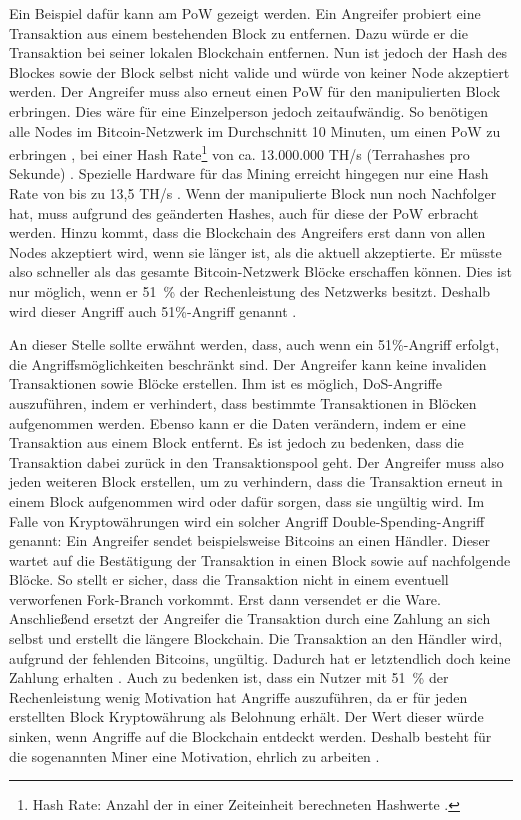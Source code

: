 Ein Beispiel dafür kann am \acs{PoW} gezeigt werden. Ein Angreifer probiert eine Transaktion aus einem bestehenden Block zu entfernen. Dazu würde er die Transaktion bei seiner lokalen Blockchain entfernen. Nun ist jedoch der Hash des Blockes sowie der Block selbst nicht valide und würde von keiner Node akzeptiert werden. Der Angreifer muss also erneut einen \acs{PoW} für den manipulierten Block erbringen. Dies wäre für eine Einzelperson jedoch zeitaufwändig. So benötigen alle Nodes im Bitcoin-Netzwerk im Durchschnitt 10 Minuten, um einen \acs{PoW} zu erbringen \cite[S.~173]{AntonopoulosMasteringbitcoin2015}, bei einer Hash Rate\footnote{Hash Rate: Anzahl der in einer Zeiteinheit berechneten Hashwerte \cite{BitcoinTeamBitcoinGlossar}.} von ca. 13.000.000 TH/s (Terrahashes pro Sekunde) \cite{EtherscanEthereumNetworkHashRate}. Spezielle Hardware für das Mining erreicht hingegen nur eine Hash Rate von bis zu 13,5 TH/s \cite{BitcoinminingLearnBitcoinmining}. Wenn der manipulierte Block nun noch Nachfolger hat, muss aufgrund des geänderten Hashes, auch für diese der \acs{PoW} erbracht werden. Hinzu kommt, dass die Blockchain des Angreifers erst dann von allen Nodes akzeptiert wird, wenn sie länger ist, als die aktuell akzeptierte. Er müsste also schneller als das gesamte Bitcoin-Netzwerk Blöcke erschaffen können. Dies ist nur möglich, wenn er 51~\% der Rechenleistung des Netzwerks besitzt. Deshalb wird dieser Angriff auch 51\%-Angriff genannt \cite[S.~83]{SwanBlockchainblueprintnew2015} \cite{EthereumTeamEthereumWhitePaper2017}. 

An dieser Stelle sollte erwähnt werden, dass, auch wenn ein 51\%-Angriff erfolgt, die Angriffsmöglichkeiten beschränkt sind. Der Angreifer kann keine invaliden Transaktionen sowie Blöcke erstellen. Ihm ist es möglich, \acs{DoS}-Angriffe auszuführen, indem er verhindert, dass bestimmte Transaktionen in Blöcken aufgenommen werden. Ebenso kann er die Daten verändern, indem er eine Transaktion aus einem Block entfernt. Es ist jedoch zu bedenken, dass die Transaktion dabei zurück in den Transaktionspool geht. Der Angreifer muss also jeden weiteren Block erstellen, um zu verhindern, dass die Transaktion erneut in einem Block aufgenommen wird oder dafür sorgen, dass sie ungültig wird. Im Falle von Kryptowährungen wird ein solcher Angriff Double-Spending-Angriff genannt: Ein Angreifer sendet beispielsweise Bitcoins an einen Händler. Dieser wartet auf die Bestätigung der Transaktion in einen Block sowie auf nachfolgende Blöcke. So stellt er sicher, dass die Transaktion nicht in einem eventuell verworfenen Fork-Branch vorkommt. Erst dann versendet er die Ware. Anschließend ersetzt der Angreifer die Transaktion durch eine Zahlung an sich selbst und erstellt die längere Blockchain. Die Transaktion an den Händler wird, aufgrund der fehlenden Bitcoins, ungültig. Dadurch hat er letztendlich doch keine Zahlung erhalten \cite{EthereumTeamEthereumWhitePaper2017}. Auch zu bedenken ist, dass ein Nutzer mit 51~\% der Rechenleistung wenig Motivation hat Angriffe auszuführen, da er für jeden erstellten Block Kryptowährung als Belohnung erhält. Der Wert dieser würde sinken, wenn Angriffe auf die Blockchain entdeckt werden. Deshalb besteht für die sogenannten Miner eine Motivation, ehrlich zu arbeiten \cite[S.196 ff.]{AntonopoulosMasteringbitcoin2015}.

